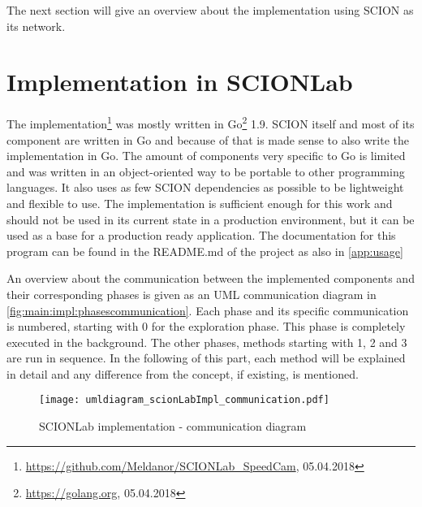 \documentclass[thesis.tex]{subfiles}
\begin{document}
The next section will give an overview about the implementation using SCION as its network.

\section{Implementation in SCIONLab} \label{sec:main:scionlabimpl}

The implementation\footnote{\url{https://github.com/Meldanor/SCIONLab_SpeedCam}, 05.04.2018} was mostly written in Go\footnote{\url{https://golang.org}, 05.04.2018} 1.9. SCION itself and most of its component are written in Go and because of that is made sense to also write the implementation in Go. The amount of components very specific to Go is limited and was written in an object-oriented way to be portable to other programming languages. It also uses as few SCION dependencies as possible to be lightweight and flexible to use. The implementation is sufficient enough for this work and should not be used in its current state in a production environment, but it can be used as a base for a production ready application. The documentation for this program can be found in the README.md of the project as also in \autoref{app:usage}

An overview about the communication between the implemented components and their corresponding phases is given as an UML communication diagram in \autoref{fig:main:impl:phasescommunication}. Each phase and its specific communication is numbered, starting with 0 for the exploration phase. This phase is completely executed in the background. The other phases, methods starting with 1, 2 and 3 are run in sequence. In the following of this part, each method will be explained in detail and any difference from the concept, if existing, is mentioned.

\begin{figure}
	\centering
	\texttt{[image: umldiagram\_scionLabImpl\_communication.pdf]}
	\caption{SCIONLab implementation - communication diagram}
	\label{fig:main:impl:phasescommunication}
\end{figure}
\end{document}
